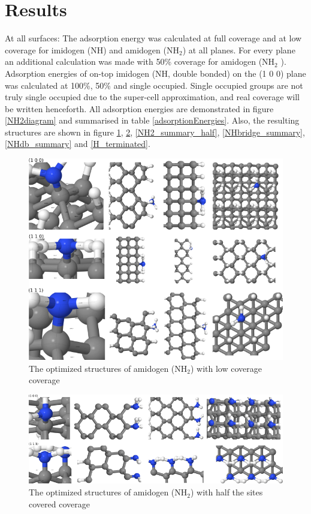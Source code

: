 \documentclass[12pt,a4paper]{article}
\begin{document}
\section{Results}
At all surfaces: The adsorption energy was calculated at full coverage and at low coverage for imidogen (NH) and amidogen (NH$_2$) at all planes. For every plane an additional calculation was made with 50\% coverage for amidogen (NH$_2$ ). Adsorption energies of on-top imidogen (NH, double bonded) on the (1 0 0) plane was calculated at 100\%, 50\% and single occupied. Single occupied groups are not truly single occupied due to the super-cell approximation, and real coverage will be written henceforth. All adsorption energies are demonstrated in figure \ref{NH2diagram} and summarised in table \ref{adsorptionEnergies}. Also, the resulting structures are shown in figure   \ref{NH2_summary_low}, \ref{NH2_summary_covered}, \ref{NH2_summary_half}, \ref{NHbridge_summary}, \ref{NHdb_summary} and \ref{H_terminated}. 

\begin{figure} \captionsetup{width=.8\linewidth} \caption{The optimized structures of amidogen (NH$_2$) with low coverage coverage} \label{NH2_summary_low}
\includegraphics[width=.8\linewidth]{pictures/NH2_summary_low.png}
\end{figure}

\begin{figure} \captionsetup{width=.8\linewidth} \caption{The optimized structures of amidogen (NH$_2$) with half the sites covered coverage} \label{NH2_summary_covered}
\includegraphics[width=.8\linewidth]{pictures/NH2_summary_covered.png}
\end{figure}
\end{document}
